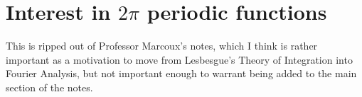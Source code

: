 \documentclass[notoc,notitlepage]{tufte-book}
\begin{document}








\appendix

\chapter{Interest in \texorpdfstring{$2 \pi$}{2pi} periodic functions}%
\label{chp:interest_in_2_pi_periodic_functions}

This is ripped out of Professor Marcoux's \cite{marcoux2019} notes,
which I think is rather important as a motivation to move from
Lesbesgue's Theory of Integration into Fourier Analysis,
but not important enough to warrant being added to the
main section of the notes.
\end{document}
